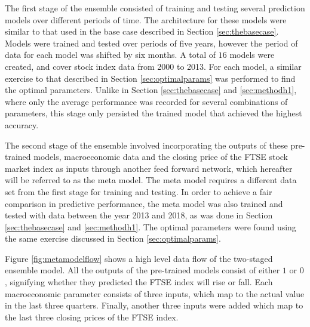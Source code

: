 \documentclass{UoYCSproject}
\begin{document}
The first stage of the ensemble consisted of training and testing several prediction models over different periods of time. The architecture for these models were similar to that used in the base case described in Section \ref{sec:thebasecase}. Models were trained and tested over periods of five years, however the period of data for each model was shifted by six months. A total of $16$ models were created, and cover stock index data from 2000 to 2013. For each model, a similar exercise to that described in Section \ref{sec:optimalparams} was performed to find the optimal parameters. Unlike in Section \ref{sec:thebasecase} and \ref{sec:methodh1}, where only the average performance was recorded for several combinations of parameters, this stage only persisted the trained model that achieved the highest accuracy.  

The second stage of the ensemble involved incorporating the outputs of these pre-trained models, macroeconomic data and the closing price of the FTSE stock market index as inputs through another feed forward network, which hereafter will be referred to as the meta model. The meta model requires a different data set from the first stage for training and testing. In order to achieve a fair comparison in predictive performance, the meta model was also trained and tested with data between the year 2013 and 2018, as was done in Section \ref{sec:thebasecase} and \ref{sec:methodh1}. The optimal parameters were found using the same exercise discussed in Section \ref{sec:optimalparams}.  

Figure \ref{fig:metamodelflow} shows a high level data flow of the two-staged ensemble model. All the outputs of the pre-trained models consist of either $1$ or $0$, signifying whether they predicted the FTSE index will rise or fall. Each macroeconomic parameter consists of three inputs, which map to the actual value in the last three quarters. Finally, another three inputs were added which map to the last three closing prices of the FTSE index. 
\end{document}
